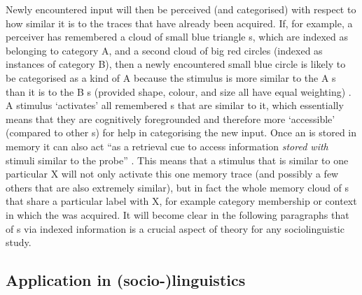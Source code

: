 Newly encountered input will then be perceived (and categorised) with respect to how similar it is to the traces that have already been acquired.
If, for example, a perceiver has remembered a cloud of small blue triangle s, which are indexed as belonging to category A, and a second cloud of big red circles (indexed as instances of category B), then a newly encountered small blue circle is likely to be categorised as a kind of A because the stimulus is more similar to the A s than it is to the B s (provided shape, colour, and size all have equal weighting) \parencite[cf.][210--212]{medinschaffer1978}.
A stimulus `activates' all remembered s that are similar to it, which essentially means that they are cognitively foregrounded and therefore more `accessible' (compared to other s) for help in categorising the new input.
Once an  is stored in memory it can also act ``as a retrieval cue to access information \emph{stored with} stimuli similar to the probe'' \parencite[210, my emphasis]{medinschaffer1978}.
This means that a stimulus that is similar to one particular  X will not only activate this one memory trace (and possibly a few others that are also extremely similar), but in fact the whole memory cloud of s that share a particular label with X, for example category membership or context in which the  was acquired.
It will become clear in the following paragraphs that  of s via indexed information is a crucial aspect of  theory for any sociolinguistic  study.

  \subsection{Application in (socio-)linguistics}
  \label{sec.sal.exemplar.socio}

